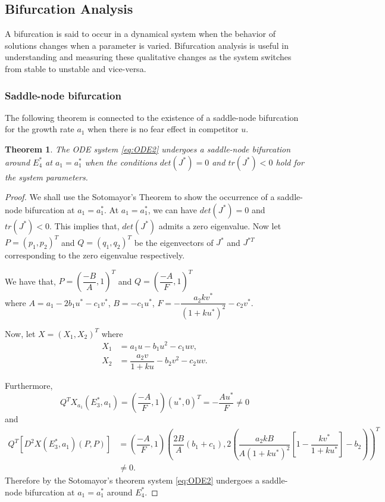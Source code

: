 \documentclass[10pt]{amsart}
\newtheorem{theorem}{Theorem}[section]
\theoremstyle{definition}
\begin{document}
\subsection{Bifurcation Analysis}
A bifurcation is said to occur in a dynamical system when the behavior of solutions changes when a parameter is varied. Bifurcation analysis is useful in understanding and measuring these qualitative changes as the system switches from stable to unstable and vice-versa. 

\subsubsection{Saddle-node bifurcation}

The following theorem is connected to the existence of a saddle-node bifurcation for the growth rate $a_1$  when there is no fear effect in competitor $u$.
\begin{theorem}\label{thm:sad}
	The ODE system \eqref{eq:ODE2} undergoes a saddle-node bifurcation around $E_4^*$ at $a_1=a_1^*$ when the conditions $det(J^{*})=0$ and $tr(J^{*})<0$ hold for the system parameters.
\end{theorem}

\begin{proof}
	We shall use the Sotomayor's Theorem \cite{perko2013differential}  to show the occurrence of a saddle-node bifurcation at $a_1=a_1^*$. At $a_1=a_1^*$, we can have $det(J^{*})=0$ and $tr(J^{*})<0$. This implies that, $det(J^{*})$ admits a zero eigenvalue. Now let $P=(p_1,p_2)^T$ and $Q=(q_1,q_2)^T$ be the eigenvectors of $J^{*}$ and $J^{*T}$ corresponding to the zero eigenvalue respectively.
	
	We have that, $P=\left(\dfrac{-B}{A},1 \right)^T$ and $Q=\left(\dfrac{-A}{F},1 \right)^T$ \\where 
	$A=a_1-2b_1 u^*-c_1 v^*$, $B=-c_1u^*$, $F=-\dfrac{a_2 k v^*}{(1+ku^*)^2}-c_2 v^*$.
	
	Now, let $X=(X_1,X_2)^T$ where 
	\begin{equation*}
		\begin{split}
			X_1&= a_1u-b_1 u^2-c_1uv,\\
			X_2&= \dfrac{a_2 v}{1+ku}-b_2v^2-c_2 uv.
		\end{split}
	\end{equation*}
	
	Furthermore, $$Q^TX_{a_1}(E_3^*,a_1)=\left(\dfrac{-A}{F},1 \right) \left(u^*,0 \right)^T=-\dfrac{Au^*}{F}\neq 0$$ and 
	\begin{align*}
		Q^T[D^2X(E_3^*,a_1)(P,P)] &=\left(\dfrac{-A}{F},1 \right) \left(\dfrac{2B}{A}\left(b_1+c_1 \right), 2\left(\dfrac{a_2 k B}{A \left(1+ku^* \right)^2} \left[1-\dfrac{kv^*}{1+ku^*} \right ] -b_2 \right)  \right)^T\\
		&\neq 0.
	\end{align*}
	Therefore by the Sotomayor's theorem system \eqref{eq:ODE2} undergoes a saddle-node bifurcation at $a_1=a_1^*$ around $E_4^*$.
\end{proof}
\end{document}
